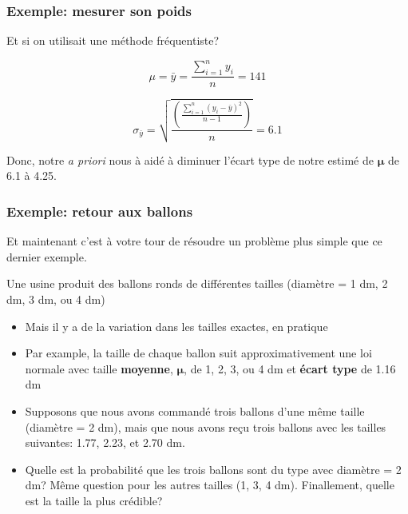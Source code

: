 \documentclass{beamer}
\begin{document}
\begin{frame}
    \frametitle{Exemple: mesurer son poids}
    Et si on utilisait une méthode fréquentiste?

    \pause

    \vfill

    \[\mu = \bar{y} = \frac{\sum_{i=1}^{n} y_i}{n} = 141\]

    \pause

    \vfill

    \[\sigma_{\bar{y}} = \sqrt{\frac{\left(\frac{\sum_{i=1}^{n} (y_i - \bar{y})^2}{n-1}\right)}{n}} = 6.1\]

    \pause

    \vfill

    Donc, notre \emph{a priori} nous à aidé à diminuer l'écart type de notre estimé de $\boldsymbol{\mu}$
    de 6.1 à 4.25.
\end{frame}


\begin{frame}
    \frametitle{Exemple: retour aux ballons}
    Et maintenant c'est à votre tour de résoudre un problème plus simple que ce dernier exemple.

    \pause

    \vfill

    Une usine produit des ballons ronds de différentes tailles (diamètre = 1 dm, 2 dm, 3 dm, ou 4 dm) \pause
    \begin{itemize}
      \item Mais il y a de la variation dans les tailles exactes, en pratique
      \pause
      \item Par example, la taille de chaque ballon suit approximativement une loi normale avec
            taille \textbf{moyenne}, $\boldsymbol{\mu}$, de 1, 2, 3, ou 4 dm et \textbf{écart type} de 1.16 dm
      \pause
      \item Supposons que nous avons commandé trois ballons d'une même taille (diamètre = 2 dm),
            mais que nous avons reçu trois ballons avec les tailles suivantes: 1.77, 2.23, et 2.70 dm.
      \pause
      \item Quelle est la probabilité que les trois ballons sont du type avec diamètre = 2 dm?
            Même question pour les autres tailles (1, 3, 4 dm). Finallement, quelle est la
            taille la plus crédible?
    \end{itemize}
\end{frame}
\end{document}
